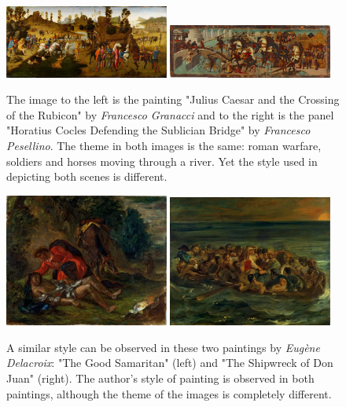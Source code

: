 \documentclass[11pt,a4paper,draft]{report}
\begin{document}
\begin{multicols}{2}
\begin{figure}[tb]  %
\centering
\includegraphics[width=0.48\textwidth]{diff_caesar}
\includegraphics[width=0.48\textwidth]{diff_horatius}
\caption[Example of different styles]{The image to the left is the painting
"Julius Caesar and the Crossing of the Rubicon" by \emph{Francesco Granacci}
and to the right is the panel "Horatius Cocles Defending the Sublician Bridge"
by \emph{Francesco Pesellino}.  The theme in both images is the same: roman
warfare, soldiers and horses moving through a river.  Yet the style used in
depicting both scenes is different.}
\label{fig:diff}
\end{figure}

\begin{figure}[tb]
\centering
\includegraphics[width=0.48\textwidth]{sim_delacroix_samaritan}
\includegraphics[width=0.48\textwidth]{sim_delacroix_shipwreck}
\caption[Example of similar styles]{A similar style can be observed in these
two paintings by \emph{Eug\`ene Delacroix}: "The Good Samaritan" (left) and
"The Shipwreck of Don Juan" (right).  The author's style of painting is
observed in both paintings, although the theme of the images is completely
different.}
\label{fig:similar}
\end{figure}


\end{multicols}
\end{document}
